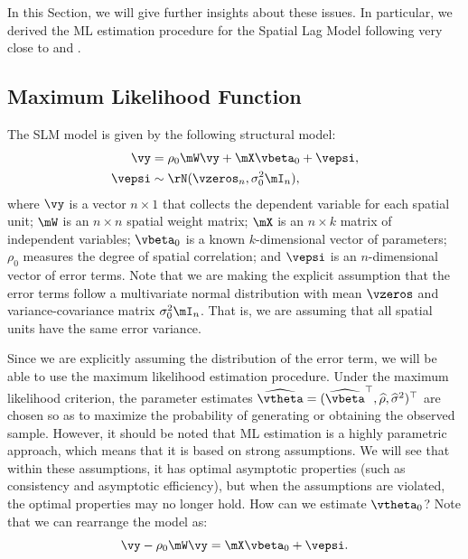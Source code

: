 \documentclass[english,12pt]{book}\usepackage[]{graphicx}\usepackage[]{xcolor}
\begin{document}
In this Section, we will give further insights about these issues. In particular, we derived the ML estimation procedure for the Spatial Lag Model following very close to \cite{ord1975estimation} and \citet[][chapter 6]{anselin1988spatial}.

\subsection{Maximum Likelihood Function}

The SLM model is given by the following structural model:
\begin{equation}
  \begin{aligned}
    \vy     & = \rho_0 \mW\vy + \mX\vbeta_0 + \vepsi, \\
     \vepsi & \sim \rN(\vzeros_n , \sigma^2_0\mI_n),
  \end{aligned}
\end{equation}
%
where $\vy$ is a vector $n\times 1$ that collects the dependent variable for each spatial unit; $\mW$ is an $n\times n$ spatial weight matrix; $\mX$ is an $n \times k$ matrix of independent variables; $\vbeta_0$ is a known $k$-dimensional vector of parameters; $\rho_0$ measures the degree of spatial correlation; and $\vepsi$ is an $n$-dimensional vector of error terms. Note that we are making the explicit assumption that the error terms follow a multivariate normal distribution with mean $\vzeros$ and variance-covariance matrix $\sigma^2_0\mI_n$. That is, we are assuming that all spatial units have the same error variance. 

Since we are explicitly assuming the distribution of the error term, we will be able to use the maximum likelihood estimation procedure. Under the maximum likelihood criterion, the parameter estimates $\widehat{\vtheta} = (\widehat{\vbeta}^\top, \widehat{\rho}, \widehat{\sigma}^2)^\top$ are chosen so as to maximize the probability of generating or obtaining the observed sample.  However, it should be noted that ML estimation is a highly parametric approach, which means that it is based on strong assumptions. We will see that within these assumptions, it has optimal asymptotic properties (such as consistency and asymptotic efficiency), but when the assumptions are violated, the optimal properties may no longer hold. 
How can we estimate $\vtheta_0$? Note that we can rearrange the model as:
\begin{equation*}
\vy - \rho_0\mW\vy = \mX\vbeta_0 + \vepsi.
\end{equation*}
\end{document}
